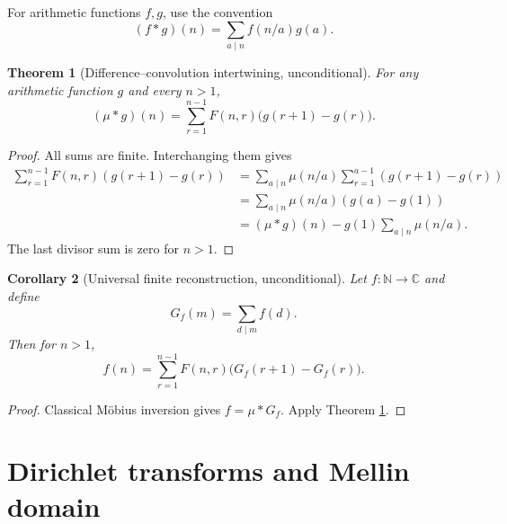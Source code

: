 \documentclass[11pt]{amsart}
\numberwithin{equation}{section}
\theoremstyle{plain}
\newtheorem{theorem}{Theorem}[section]
\newtheorem{corollary}[theorem]{Corollary}
\theoremstyle{definition}
\theoremstyle{remark}
\newcommand{\N}{\mathbb N}
\newcommand{\C}{\mathbb C}
\newcommand{\mob}{\mu}
\newcommand{\Fsurf}{F}
\begin{document}
For arithmetic functions $f,g$, use the convention
\begin{equation}
(f*g)(n)=\sum_{a\mid n}f(n/a)g(a).
\label{eq:dirichlet_convolution}
\end{equation}

\begin{theorem}[Difference--convolution intertwining, unconditional]
\label{thm:intertwining}
For any arithmetic function $g$ and every $n>1$,
\begin{equation}
(\mob*g)(n)=\sum_{r=1}^{n-1}\Fsurf(n,r)\bigl(g(r+1)-g(r)\bigr).
\label{eq:intertwining}
\end{equation}
\end{theorem}

\begin{proof}
All sums are finite.  Interchanging them gives
\begin{align}
\sum_{r=1}^{n-1}\Fsurf(n,r)(g(r+1)-g(r))
&=\sum_{a\mid n}\mob(n/a)\sum_{r=1}^{a-1}(g(r+1)-g(r))
\label{eq:intertwining_swap}\\
&=\sum_{a\mid n}\mob(n/a)(g(a)-g(1))
\label{eq:intertwining_telescope}\\
&=(\mob*g)(n)-g(1)\sum_{a\mid n}\mob(n/a).
\label{eq:intertwining_last}
\end{align}
The last divisor sum is zero for $n>1$.
\end{proof}

\begin{corollary}[Universal finite reconstruction, unconditional]
\label{cor:universal_reconstruction}
Let $f:\N\to\C$ and define
\begin{equation}
G_f(m)=\sum_{d\mid m}f(d).
\label{eq:Gf_definition}
\end{equation}
Then for $n>1$,
\begin{equation}
f(n)=\sum_{r=1}^{n-1}\Fsurf(n,r)\bigl(G_f(r+1)-G_f(r)\bigr).
\label{eq:universal_reconstruction}
\end{equation}
\end{corollary}

\begin{proof}
Classical Möbius inversion gives $f=\mob*G_f$.  Apply Theorem \ref{thm:intertwining}.
\end{proof}

\section{Dirichlet transforms and Mellin domain}
\label{sec:analytic_transforms}
\end{document}
